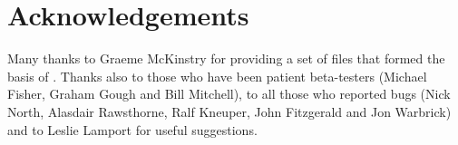 \section{Acknowledgements}

Many thanks to Graeme McKinstry for providing a set of files that
formed the basis of \pslatex.  Thanks also to those who have been
patient beta-testers (Michael Fisher, Graham Gough and Bill Mitchell),
to all those who reported bugs (Nick North, Alasdair Rawsthorne, Ralf
Kneuper, John Fitzgerald and Jon Warbrick) and to Leslie Lamport for
useful suggestions.


